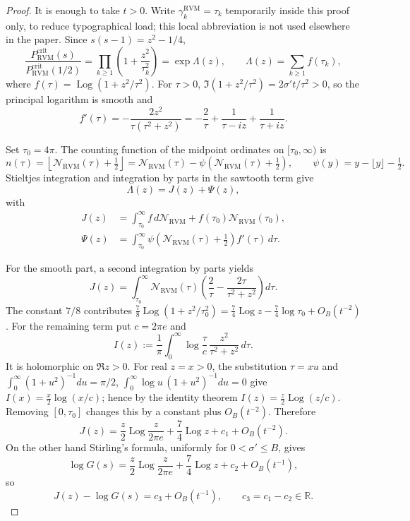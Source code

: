 \documentclass[11pt,reqno]{amsart}
\theoremstyle{definition}
\theoremstyle{remark}
\newcommand{\R}{\mathbb R}
\newcommand{\Log}{\operatorname{Log}}
\newcommand{\RVM}{\mathrm{RVM}}
\newcommand{\crit}{\mathrm{crit}}
\begin{document}
\begin{proof}
It is enough to take $t>0$.  Write $\gamma_k^{\RVM}=\tau_k$ temporarily inside this proof only, to reduce typographical load; this local abbreviation is not used elsewhere in the paper.  Since $s(s-1)=z^2-1/4$,
\begin{equation}\label{eq:transition-product}
 \frac{P_{\RVM}^{\crit}(s)}{P_{\RVM}^{\crit}(1/2)}
 =\prod_{k\ge1}\left(1+\frac{z^2}{\tau_k^2}\right)
 =\exp\Lambda(z),\qquad
 \Lambda(z)=\sum_{k\ge1}f(\tau_k),
\end{equation}
where $f(\tau)=\Log(1+z^2/\tau^2)$.  For $\tau>0$,
$\Im(1+z^2/\tau^2)=2\sigma't/\tau^2>0$, so the principal logarithm is smooth and
\begin{equation}\label{eq:fprime}
 f'(\tau)=-\frac{2z^2}{\tau(\tau^2+z^2)}
 =-\frac2\tau+\frac1{\tau-iz}+\frac1{\tau+iz}.
\end{equation}

Set $\tau_0=4\pi$.  The counting function of the midpoint ordinates on $[\tau_0,\infty)$ is
\[
 n(\tau)=\left\lfloor\mathcal N_{\RVM}(\tau)+\tfrac12\right\rfloor
 =\mathcal N_{\RVM}(\tau)-\psi(\mathcal N_{\RVM}(\tau)+\tfrac12),
 \qquad \psi(y)=y-\lfloor y\rfloor-\tfrac12.
\]
Stieltjes integration and integration by parts in the sawtooth term give
\begin{equation}\label{eq:transition-split}
 \Lambda(z)=J(z)+\Psi(z),
\end{equation}
with
\begin{align}
 J(z)&=\int_{\tau_0}^{\infty}f\,d\mathcal N_{\RVM}+f(\tau_0)\mathcal N_{\RVM}(\tau_0),\label{eq:Jtransition}\\
 \Psi(z)&=\int_{\tau_0}^{\infty}\psi(\mathcal N_{\RVM}(\tau)+\tfrac12)f'(\tau)\,d\tau.\label{eq:Psitransition}
\end{align}

For the smooth part, a second integration by parts yields
\[
 J(z)=\int_{\tau_0}^{\infty}\mathcal N_{\RVM}(\tau)
 \left(\frac2\tau-\frac{2\tau}{\tau^2+z^2}\right)d\tau.
\]
The constant $7/8$ contributes
$\frac78\Log(1+z^2/\tau_0^2)=\frac74\Log z-\frac74\log\tau_0+O_B(t^{-2})$.
For the remaining term put $c=2\pi e$ and
\[
 I(z):=\frac1\pi\int_0^\infty\log\frac\tau c\,\frac{z^2}{\tau^2+z^2}\,d\tau.
\]
It is holomorphic on $\Re z>0$.  For real $z=x>0$, the substitution $\tau=xu$ and
$\int_0^\infty(1+u^2)^{-1}du=\pi/2$, $\int_0^\infty\log u\,(1+u^2)^{-1}du=0$
give $I(x)=\frac x2\log(x/c)$; hence by the identity theorem
$I(z)=\frac z2\Log(z/c)$.  Removing $[0,\tau_0]$ changes this by a constant plus $O_B(t^{-2})$.  Therefore
\begin{equation}\label{eq:Jasymp}
 J(z)=\frac z2\Log\frac z{2\pi e}+\frac74\Log z+c_1+O_B(t^{-2}).
\end{equation}
On the other hand Stirling's formula, uniformly for $0<\sigma'\le B$, gives
\begin{equation}\label{eq:Gasymp}
 \log G(s)=\frac z2\Log\frac z{2\pi e}+\frac74\Log z+c_2+O_B(t^{-1}),
\end{equation}
so
\begin{equation}\label{eq:smooth-difference}
 J(z)-\log G(s)=c_3+O_B(t^{-1}),\qquad c_3=c_1-c_2\in\R.
\end{equation}


\end{proof}
\end{document}

